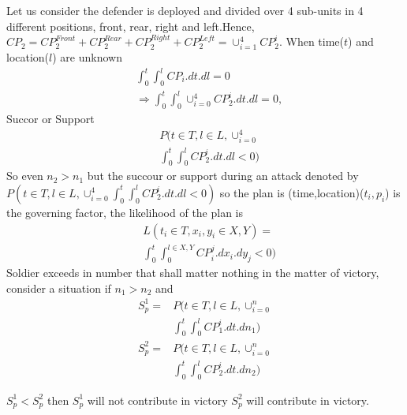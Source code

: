 \documentclass[]{article}
\begin{document}
Let us consider the defender is deployed and  divided over 4 sub-units in 4 different positions, front, rear, right and left.Hence,
$CP_2=CP_2^{Front}+CP_2^{Rear}+CP_2^{Right}+CP_2^{Left}=\cup_{i=1}^4CP_2^i$.
When time($t$) and location($l$) are unknown
\begin{equation}
\begin{split}
   &\int_0^{t}\int_0^{l}CP_i.dt.dl =0 \\&\Rightarrow \int_0^{t}\int_0^{l}\cup_{i=0}^4{CP}_2^i.dt.dl =0,  
\end{split}
\end{equation}
Succor or Support
\begin{equation}
\begin{split}
 &P(t \in T, l\in L, \cup_{i=0}^4\\&\int_0^{t}\int_0^{l}{CP}_2^i.dt.dl <0)   
\end{split}
\end{equation}
So even $n_2>n_1$ but the succour or support during an attack denoted by $ P(t \in T, l\in L, \cup_{i=0}^4\int_0^{t}\int_0^{l}{CP}_2^i.dt.dl <0) $ so the plan is (time,location)($t_i,p_i$) is the governing factor, the likelihood of the plan is
\begin{equation}
\begin{split}
&L(t_i\in T, x_i,y_i \in X,Y) =\\&\int_0^{t}\int_0^{l\in X,Y}{CP}_i^j.dx_i.dy_j <0) 
\end{split}
\end{equation}
Soldier exceeds in number that shall matter nothing in the matter of victory, consider a situation if $n_1>n_2$ and
\begin{equation}
\begin{split}
  S_p^1= &P(t \in T, l\in L, \cup_{i=0}^n\\&\int_0^{t}\int_0^{l}{CP}_1^i.dt.dn_1) \\
    S_p^2= &P(t \in T, l\in L, \cup_{i=0}^n\\&\int_0^{t}\int_0^{l}{CP}_2^i.dt.dn_2)    
\end{split}
\end{equation}

$S_p^1<S_p^2$ then $S_p^1$ will not contribute in victory $S_p^2$ will contribute in victory.
\end{document}
